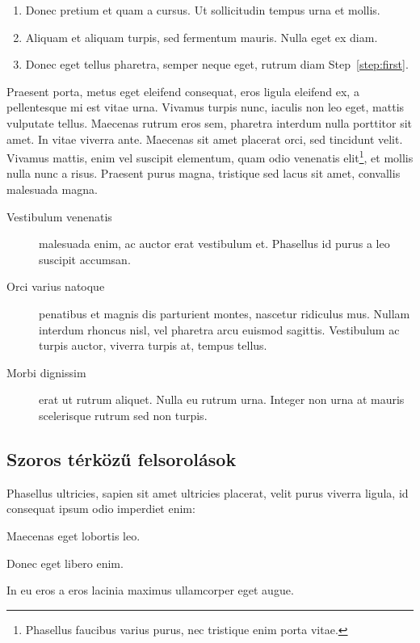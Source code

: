 \begin{enumerate}
	\item\label{step:first} Donec pretium et quam a cursus. Ut sollicitudin tempus urna et mollis.
	\item Aliquam et aliquam turpis, sed fermentum mauris. Nulla eget ex diam.
	\item Donec eget tellus pharetra, semper neque eget, rutrum diam Step~\ref{step:first}.
\end{enumerate}

Praesent porta, metus eget eleifend consequat, eros ligula eleifend ex, a pellentesque mi est vitae urna. Vivamus turpis nunc, iaculis non leo eget, mattis vulputate tellus. Maecenas rutrum eros sem, pharetra interdum nulla porttitor sit amet. In vitae viverra ante. Maecenas sit amet placerat orci, sed tincidunt velit. Vivamus mattis, enim vel suscipit elementum, quam odio venenatis elit\footnote{Phasellus faucibus varius purus, nec tristique enim porta vitae.}, et mollis nulla nunc a risus. Praesent purus magna, tristique sed lacus sit amet, convallis malesuada magna. 

\begin{description}
	\item[Vestibulum venenatis] malesuada enim, ac auctor erat vestibulum et. Phasellus id purus a leo suscipit accumsan.
	\item[Orci varius natoque] penatibus et magnis dis parturient montes, nascetur ridiculus mus. Nullam interdum rhoncus nisl, vel pharetra arcu euismod sagittis. Vestibulum ac turpis auctor, viverra turpis at, tempus tellus.
	\item[Morbi dignissim] erat ut rutrum aliquet. Nulla eu rutrum urna. Integer non urna at mauris scelerisque rutrum sed non turpis.
\end{description}

\subsection{Szoros térközű felsorolások} %

Phasellus ultricies, sapien sit amet ultricies placerat, velit purus viverra ligula, id consequat ipsum odio imperdiet enim:
\begin{compactenum}
	\item Maecenas eget lobortis leo.
	\item Donec eget libero enim.
	\item In eu eros a eros lacinia maximus ullamcorper eget augue.
\end{compactenum}

